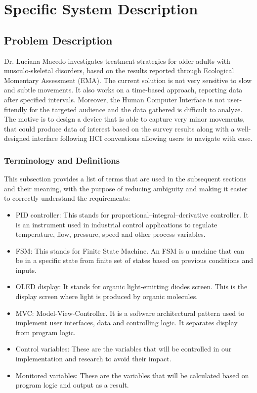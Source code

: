 \documentclass[12pt]{article}
\begin{document}
\section{Specific System Description}
\subsection{Problem Description} \label{Sec_pd}

Dr. Luciana Macedo investigates treatment strategies for older adults with musculo-skeletal disorders, based on the results reported through Ecological Momentary Assessment (EMA).
The current solution is not very sensitive to slow and subtle movements. It also works on a time-based approach, reporting data after specified intervals. Moreover, the Human Computer Interface is not user-friendly for the targeted audience and the data gathered is difficult to analyze.
The motive is to design a device that is able to capture very minor movements, that could produce data of interest based on the survey results along with a well-designed interface following HCI conventions allowing users to navigate with ease.

\subsubsection{Terminology and  Definitions}

This subsection provides a list of terms that are used in the subsequent
sections and their meaning, with the purpose of reducing ambiguity and making it
easier to correctly understand the requirements:

\begin{itemize}

  \item PID controller: This stands for proportional–integral–derivative controller. It is an instrument used in industrial control applications to regulate temperature, flow, pressure, speed and other process variables.
  \item FSM: This stands for Finite State Machine. An FSM is a machine that can be in a specific state from finite set of states based on previous conditions and inputs.
  \item OLED display: It stands for organic light-emitting diodes screen. This is the display screen where light is produced by organic molecules.
  \item MVC: Model-View-Controller. It is a software architectural pattern used to implement user interfaces, data and controlling logic. It separates display from program logic.
  \item Control variables: These are the variables that will be controlled in our implementation and research to avoid their impact.
  \item Monitored variables: These are the variables that will be calculated based on program logic and output as a result.

\end{itemize}
\end{document}
